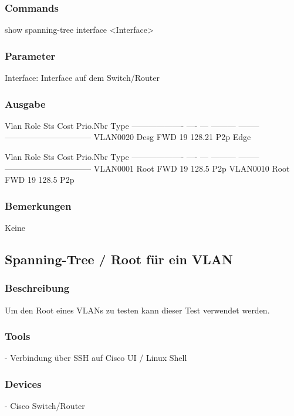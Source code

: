 \documentclass[a4,12pt]{scrartcl}
\begin{document}
\subsubsection{Commands}
show spanning-tree interface <Interface>
\subsubsection{Parameter}
Interface: Interface auf dem Switch/Router
\subsubsection{Ausgabe}
Vlan                Role Sts Cost      Prio.Nbr Type\newline
------------------- ---- --- --------- -------- --------------------------------\newline
VLAN0020            Desg FWD 19        128.21   P2p Edge\newline

Vlan                Role Sts Cost      Prio.Nbr Type\newline
------------------- ---- --- --------- -------- --------------------------------\newline
VLAN0001            Root FWD 19        128.5    P2p\newline
VLAN0010            Root FWD 19        128.5    P2p\newline
\subsubsection{Bemerkungen}
Keine




\subsection{Spanning-Tree / Root für ein VLAN}
\subsubsection{Beschreibung}
Um den Root eines VLANs zu testen kann dieser Test verwendet werden.
\subsubsection{Tools}
- Verbindung über SSH auf Cisco UI / Linux Shell
\subsubsection{Devices}
- Cisco Switch/Router
\end{document}
